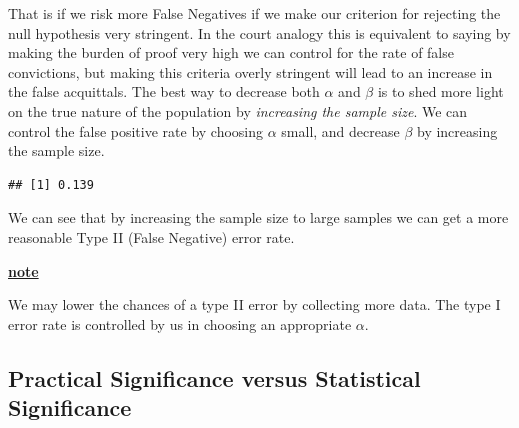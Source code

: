 \documentclass[
]{book}
\newenvironment{Shaded}{\begin{snugshade}}{\end{snugshade}}
\newcommand{\AttributeTok}[1]{\textcolor[rgb]{0.77,0.63,0.00}{#1}}
\newcommand{\DecValTok}[1]{\textcolor[rgb]{0.00,0.00,0.81}{#1}}
\newcommand{\DocumentationTok}[1]{\textcolor[rgb]{0.56,0.35,0.01}{\textbf{\textit{#1}}}}
\newcommand{\FloatTok}[1]{\textcolor[rgb]{0.00,0.00,0.81}{#1}}
\newcommand{\FunctionTok}[1]{\textcolor[rgb]{0.00,0.00,0.00}{#1}}
\newcommand{\NormalTok}[1]{#1}
\newcommand{\OtherTok}[1]{\textcolor[rgb]{0.56,0.35,0.01}{#1}}
\newcommand{\SpecialCharTok}[1]{\textcolor[rgb]{0.00,0.00,0.00}{#1}}
\newcommand{\StringTok}[1]{\textcolor[rgb]{0.31,0.60,0.02}{#1}}
\newenvironment{rmdblock}[1]
  {\begin{shaded*}
  \centerline{\underline{\textbf{#1}}}

  }
  {
  \end{shaded*}
  }
\newenvironment{note}
  {\begin{rmdblock}{note}}
  {\end{rmdblock}}
\theoremstyle{definition}
\theoremstyle{definition}
\theoremstyle{definition}
\theoremstyle{definition}
\theoremstyle{remark}
\begin{document}
That is if we risk more False Negatives if we make our criterion for rejecting the null hypothesis very stringent. In the court analogy this is equivalent to saying by making the burden of proof very high we can control for the rate of false convictions, but making this criteria overly stringent will lead to an increase in the false acquittals. The best way to decrease both \(\alpha\) and \(\beta\) is to shed more light on the true nature of the population by \emph{increasing the sample size}. We can control the false positive rate by choosing \(\alpha\) small, and decrease \(\beta\) by increasing the sample size.

\begin{Shaded}
\end{Shaded}

\begin{verbatim}
## [1] 0.139
\end{verbatim}

We can see that by increasing the sample size to large samples we can get a more reasonable Type II (False Negative) error rate.

\begin{note}
We may lower the chances of a type II error by collecting more data. The type I error rate is controlled by us in choosing an appropriate \(\alpha\).
\end{note}

\hypertarget{practical-significance-versus-statistical-significance}{%
\subsection{Practical Significance versus Statistical Significance}\label{practical-significance-versus-statistical-significance}}
\end{document}
